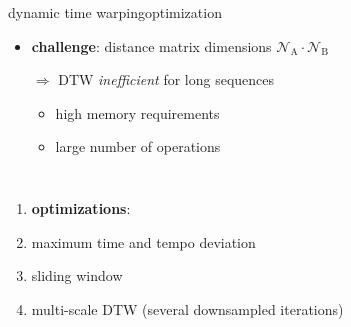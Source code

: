         \begin{frame}{dynamic time warping}{optimization}
            \vspace{-3mm}
            \begin{itemize}
                \item \textbf{challenge}:  distance matrix dimensions  $\mathcal{N}_\mathrm{A}\cdot \mathcal{N}_\mathrm{B}$
                \smallskip
                \item[$\Rightarrow$] DTW \textit{inefficient} for long sequences 
                    \begin{itemize}
                        \item	high memory requirements
                        \item	large number of operations
                    \end{itemize}
            \end{itemize}
            \vspace{-2mm}
            \begin{columns}
                 
                    \begin{enumerate}
                        \item<2->[] \textbf{optimizations}: 
                        \item<2->	maximum time and tempo deviation
                        \item<3->	sliding window 
                        \item<4->	multi-scale DTW (several downsampled iterations)
                    \end{enumerate}
            \end{columns}
            \vspace{-2mm}
        \end{frame}

